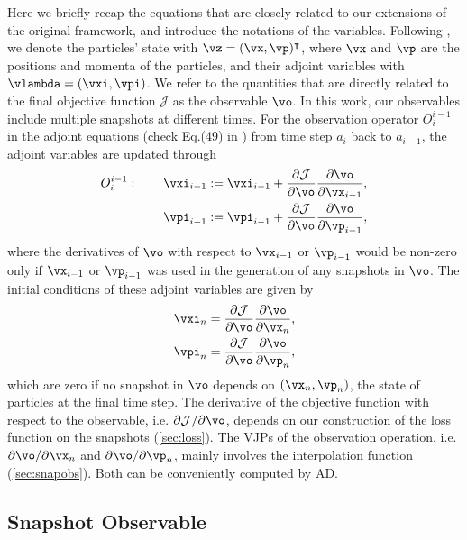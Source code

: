 \documentclass[modern, trackchanges, dvipsnames]{aastex631}
\newcommand{\p}{\partial}
\newcommand{\cJ}{\mathcal{J}}
\begin{document}
Here we briefly recap the equations that are closely related to our
extensions of the original framework, and introduce the notations of the
variables.
Following \cite{Li2022a}, we denote the particles' state with $\vz =
(\vx, \vp)^\intercal$, where $\vx$ and $\vp$ are the positions and
momenta of the particles, and their adjoint variables with $\vlambda =
(\vxi, \vpi)$.
We refer to the quantities that are directly related to the final
objective function $\cJ$ as the observable $\vo$.
In this work, our observables include multiple snapshots at different
times.
For the observation operator $O_{i}^{i-1}$ in the adjoint equations
(check Eq.(49) in \cite{Li2022a}) from time step $a_i$ back to
$a_{i-1}$, the adjoint variables are updated through
\begin{align}
  O_i^{i-1}: \qquad \vxi_{i-1} &:= \vxi_{i-1} +
              \frac{\p\cJ}{\p\vo}\frac{\p\vo}{\p \vx_{i-1}}, \nonumber\\
  \vpi_{i-1} &:= \vpi_{i-1} +
                          \frac{\p\cJ}{\p\vo}\frac{\p\vo}{\p \vp_{i-1}},
\end{align}
where the derivatives of $\vo$ with respect to $\vx_{i-1}$ or
$\vp_{i-1}$ would be non-zero only if $\vx_{i-1}$ or $\vp_{i-1}$ was
used in the generation of any snapshots in $\vo$.
The initial conditions of these adjoint variables are given by
\begin{align}
  \vxi_n &= \frac{\p\cJ}{\p\vo}\frac{\p\vo}{\p\vx_n}, \nonumber\\
  \vpi_n &= \frac{\p\cJ}{\p\vo}\frac{\p\vo}{\p\vp_n},
\end{align}
which are zero if no snapshot in $\vo$ depends on $(\vx_n, \vp_n)$, the
state of particles at the final time step.
The derivative of the objective function with respect to the observable,
i.e. $\p\cJ/\p\vo$, depends on our construction of the loss function on
the snapshots (\autoref{sec:loss}).
The VJPs of the observation operation, i.e. $\p\vo/\p\vx_n$ and
$\p\vo/\p\vp_n$, mainly involves the interpolation function
(\autoref{sec:snapobs}).
Both can be conveniently computed by AD.


\vspace{1em}
\subsection{Snapshot Observable}
\label{sec:snapobs}
\end{document}
